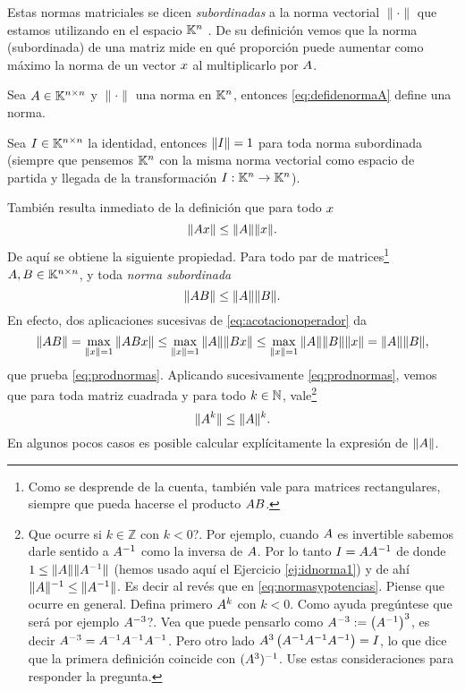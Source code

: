 Estas normas matriciales se dicen \emph{subordinadas} a la norma vectorial $\|\cdot\|$ que estamos utilizando
en el espacio $\mathbb K^{n}$ . De su definición vemos que  la norma (subordinada) de una matriz mide en qué proporción puede aumentar como máximo la norma de un vector $\xb$ al multiplicarlo por $\Ab$.

\begin{ej}
Sea $\Ab\in \Knn$ y $\|\cdot\|$ una norma en $\mathbb K^{n}$, entonces
 \eqref{eq:defidenormaA} define una norma.
\end{ej}
\begin{ej}
\label{ej:idnorma1}
Sea $\Ib\in \Knn$ la identidad, entonces
 $\|\Ib\|=1$ para toda norma subordinada (siempre que pensemos $\mathbb K^{n}$ con la misma norma vectorial como espacio de partida y llegada de la transformación $\Ib:\Kn\to \Kn$).
\end{ej}

También resulta inmediato de la definición que para todo $\xb$
\begin{equation}
 \label{eq:acotacionoperador}
\|\Ab\xb\|\le \|\Ab\|\|\xb\|.
\end{equation}
De aquí se obtiene la siguiente propiedad. Para todo par de matrices\footnote{Como se desprende de la cuenta,  también vale para matrices rectangulares, siempre que pueda hacerse el producto $\Ab\Bb$.} $\Ab, \Bb\in \Knn$, y toda \emph{norma subordinada}
\begin{equation}
 \label{eq:prodnormas}
\|\Ab\Bb\|\le \|\Ab\|\|\Bb\|.
\end{equation}
En efecto,
dos aplicaciones sucesivas de \eqref{eq:acotacionoperador} da
$$
 \|\Ab\Bb\|=\max_{\|\xb\|=1}
\|\Ab\Bb\xb\|\le \max_{\|\xb\|=1}
\|\Ab\|\|\Bb\xb\|\le \max_{\|\xb\|=1}\|\Ab\|\|\Bb\|\|\xb\|=\|\Ab\|\|\Bb\|,$$
que prueba \eqref{eq:prodnormas}.
Aplicando sucesivamente \eqref{eq:prodnormas}, vemos que para toda matriz cuadrada y para todo $k\in\mathbb N$, vale\footnote{Que ocurre si $k\in \mathbb{Z}$ con $k<0$?. Por ejemplo, cuando $\Ab$ es invertible sabemos darle sentido a $\Ab^{-1}$ como la inversa de $\Ab$.
Por lo tanto $\Ib=\Ab\Ab^{-1}$ de donde $1\le \|\Ab\|\|\Ab^{-1}\|$  (hemos usado aquí el Ejercicio \ref{ej:idnorma1}) y de ahí $\|\Ab\|^{-1}\le \|\Ab^{-1}\|$. Es decir al revés que en  \eqref{eq:normasypotencias}.  Piense que ocurre en general. Defina primero $\Ab^{k}$ con $k<0$. Como ayuda pregúntese que será por ejemplo $\Ab^{-3}$?. Vea que puede pensarlo como $\Ab^{-3}:=\left(\Ab^{-1}\right)^3$, es decir $\Ab^{-3}=\Ab^{-1}\Ab^{-1}\Ab^{-1}$. Pero otro lado $\Ab^3\left(\Ab^{-1}\Ab^{-1}\Ab^{-1}\right)=\Ib$, lo que dice que la primera definición coincide con $(\Ab^3)^{-1}$. Use estas consideraciones para responder la pregunta.}
\begin{equation}
 \label{eq:normasypotencias}
\|\Ab^k\|\le \|\Ab\|^k.
 \end{equation}
En algunos pocos casos es posible calcular explícitamente la expresión de $\|\Ab\|$.

